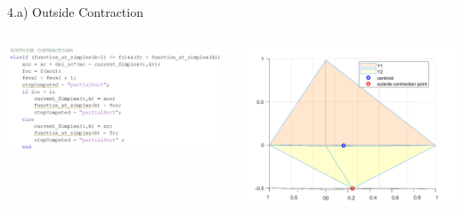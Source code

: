 \documentclass{beamer}
\begin{document}
\begin{frame}{4.a) Outside Contraction}
	\begin{columns}
	\begin{column}{0.49\linewidth}
		\centering
		\includegraphics[width=0.95\linewidth]{OC}
	\end{column}
	\begin{column}{0.5\linewidth}
		\centering
		\includegraphics[width=0.95\linewidth]{OCFig}
	\end{column}
	\end{columns}
\end{frame}
\end{document}
